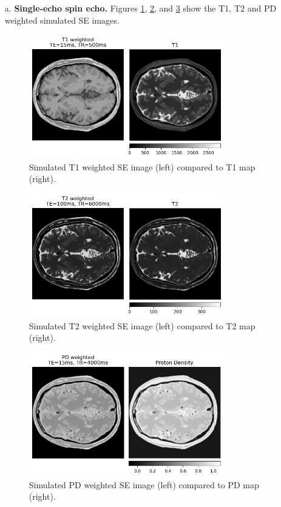 \documentclass{article}
\begin{document}
\begin{itemize}
    \item[a. ] \textbf{Single-echo spin echo.}
    Figures \ref{fig:2_a_t1}, \ref{fig:2_a_t2}, and \ref{fig:2_a_pd} show the T1, T2 and PD weighted simulated SE images. 

    \begin{figure}[]
        \centering
        \includegraphics[width=0.8\textwidth]{figures/2_a_t1.png}
        \caption{Simulated T1 weighted SE image (left) compared to T1 map (right).}
        \label{fig:2_a_t1}
    \end{figure}

    \begin{figure}[]
        \centering
        \includegraphics[width=0.8\textwidth]{figures/2_a_t2.png}
        \caption{Simulated T2 weighted SE image (left) compared to T2 map (right).}
        \label{fig:2_a_t2}
    \end{figure}

    \begin{figure}[]
        \centering
        \includegraphics[width=0.8\textwidth]{figures/2_a_pd.png}
        \caption{Simulated PD weighted SE image (left) compared to PD map (right).}
        \label{fig:2_a_pd}
    \end{figure}


\end{itemize}
\end{document}

